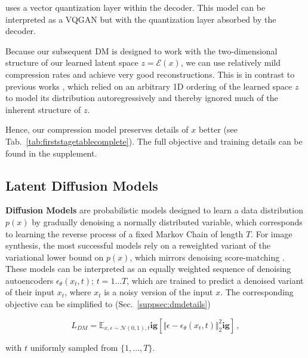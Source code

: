uses a vector quantization layer \cite{DBLP:conf/nips/OordVK17} within the decoder. This model can be interpreted as a VQGAN \cite{DBLP:journals/corr/abs-2012-09841} but with the quantization layer absorbed by the decoder. 

Because our subsequent DM is designed to work with the two-dimensional structure of our learned latent space $z=\mathcal{E}(x)$, we can use relatively mild compression rates and achieve very good reconstructions. This is in contrast to previous works \cite{DBLP:journals/corr/abs-2012-09841,
DBLP:journals/corr/abs-2102-12092},
which relied on an arbitrary 1D ordering of the learned space $z$ to model its distribution autoregressively and thereby ignored much of the inherent structure of $z$.

Hence, our compression model preserves details of $x$ better (see Tab.~\ref{tab:firststagetablecomplete}).
The full objective and training details can be found in the supplement.

\subsection{Latent Diffusion Models}
\label{subsec:stagetwo}

 \textbf{Diffusion Models} \cite{DBLP:journals/corr/Sohl-DicksteinW15} are probabilistic models designed to learn a data distribution $p(x)$ by gradually denoising a normally distributed variable, which corresponds to learning the reverse process of a fixed Markov Chain of length $T$. For image synthesis, the most successful models \cite{DBLP:conf/nips/HoJA20, DBLP:journals/corr/abs-2105-05233, DBLP:journals/corr/abs-2104-07636} rely on a reweighted variant of the variational lower bound on $p(x)$, which mirrors denoising score-matching \cite{DBLP:journals/corr/abs-2011-13456}. These models can be interpreted as an equally weighted sequence of denoising autoencoders $\epsilon_\theta(x_{t},t);\, t=1\dots T$, which are trained to predict a denoised variant of their input $x_t$, where $x_t$ is a noisy version of the input $x$. The corresponding objective can be simplified to (Sec.~\ref{suppsec:dmdetails})

\begin{equation}
L_{DM} = \mathbb{E}_{x, \epsilon \sim \mathcal{N}(0, 1),  t }\mathbf{ig}[ \Vert \epsilon - \epsilon_\theta(x_{t},t) \Vert_{2}^{2}\mathbf{ig}] \, ,
\label{eq:dmloss}
\end{equation}

with $t$ uniformly sampled from $\{1, \dots, T\}$.

